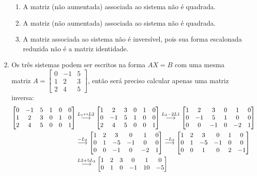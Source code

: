 \documentclass[12pt,a4paper]{article}
\newcommand{\grstep}[2][\relax]{%
   \ensuremath{\mathrel{
       {\mathop{\longrightarrow}\limits^{#2\mathstrut}_{
                                     \begin{subarray}{l} #1 \end{subarray}}}}}}
\newcommand{\swap}{\leftrightarrow}
\begin{document}
\begin{enumerate}
\begin{enumerate}
\item A matriz (não aumentada) associada ao sistema não é quadrada.
\item A matriz (não aumentada) associada ao sistema não é quadrada.
\item A matriz associada ao sistema não é inversível, pois sua forma escalonada reduzida não é a matriz identidade.
\end{enumerate}

\item Os três sistemas podem ser escritos na forma $AX=B$ com uma mesma matriz $A = \begin{bmatrix}
0 & -1 & 5 \\
1 & 2 & 3 \\
2 & 4 & 5
\end{bmatrix}$, então será preciso calcular apenas uma matriz inversa:
\begin{align*}
\begin{bmatrix}
0 & -1 & 5 & 1 & 0 & 0\\
1 & 2 & 3 & 0 & 1 & 0\\
2 & 4 & 5 & 0 & 0 & 1
\end{bmatrix}
&
\grstep{ L_1 \swap L2 }
\begin{bmatrix}
1 & 2 & 3 & 0 & 1 & 0\\
0 & -1 & 5 & 1 & 0 & 0\\
2 & 4 & 5 & 0 & 0 & 1
\end{bmatrix}
\grstep{ L_3 - 2 L1 }
\begin{bmatrix}
1 & 2 & 3 & 0 & 1 & 0\\
0 & -1 & 5 & 1 & 0 & 0\\
0 & 0 & -1 & 0 & -2 & 1
\end{bmatrix} \\
&
\grstep{ -L_2 }
\begin{bmatrix}
1 & 2 & 3 & 0 & 1 & 0\\
0 & 1 & -5 & -1 & 0 & 0\\
0 & 0 & -1 & 0 & -2 & 1
\end{bmatrix}
\grstep{ -L_3 }
\begin{bmatrix}
1 & 2 & 3 & 0 & 1 & 0\\
0 & 1 & -5 & -1 & 0 & 0\\
0 & 0 & 1 & 0 & 2 & -1
\end{bmatrix} \\
&
\grstep{ L2+5L_3 }
\begin{bmatrix}
1 & 2 & 3 & 0 & 1 & 0\\
0 & 1 & 0 & -1 & 10 & -5\\

\end{bmatrix}
\end{align*}
\end{enumerate}
\end{document}
